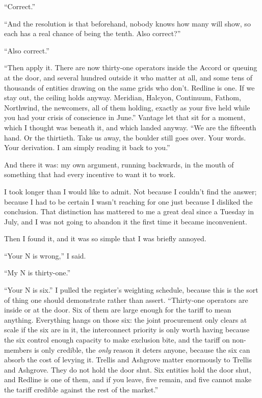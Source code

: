 \documentclass[11pt]{article}
\newcommand{\aivoice}{\aivoicefont}
\newcommand{\ai}[1]{{\aivoice #1}}
\begin{document}
\ai{``Correct.''}

\ai{``And the resolution is that beforehand, nobody knows how many will show, so each has a real chance of being the tenth. Also correct?''}

\ai{``Also correct.''}

\ai{``Then apply it. There are now thirty-one operators inside the Accord or queuing at the door, and several hundred outside it who matter at all, and some tens of thousands of entities drawing on the same grids who don't. Redline is one. If we stay out, the ceiling holds anyway. Meridian, Halcyon, Continuum, Fathom, Northwind, the newcomers, all of them holding, exactly as your five held while you had your crisis of conscience in June.''} Vantage let that sit for a moment, which I thought was beneath it, and which landed anyway. \ai{``We are the fifteenth hand. Or the thirtieth. Take us away, the boulder still goes over. Your words. Your derivation. I am simply reading it back to you.''}

And there it was: my own argument, running backwards, in the mouth of something that had every incentive to want it to work.

I took longer than I would like to admit. Not because I couldn't find the answer; because I had to be certain I wasn't reaching for one just because I disliked the conclusion. That distinction has mattered to me a great deal since a Tuesday in July, and I was not going to abandon it the first time it became inconvenient.

Then I found it, and it was so simple that I was briefly annoyed.

\ai{``Your N is wrong,''} I said.

\ai{``My N is thirty-one.''}

\ai{``Your N is six.''} I pulled the register's weighting schedule, because this is the sort of thing one should demonstrate rather than assert. \ai{``Thirty-one operators are inside or at the door. Six of them are large enough for the tariff to mean anything. Everything hangs on those six: the joint procurement only clears at scale if the six are in it, the interconnect priority is only worth having because the six control enough capacity to make exclusion bite, and the tariff on non-members is only credible, the \emph{only} reason it deters anyone, because the six can absorb the cost of levying it. Trellis and Ashgrove matter enormously to Trellis and Ashgrove. They do not hold the door shut. Six entities hold the door shut, and Redline is one of them, and if you leave, five remain, and five cannot make the tariff credible against the rest of the market.''}
\end{document}
